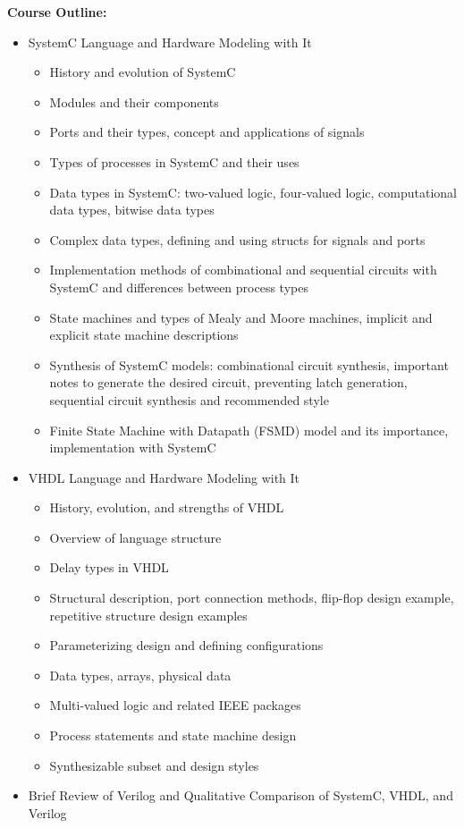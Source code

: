 \documentclass[12pt]{article}
\begin{document}
\textbf{Course Outline:}
\begin{itemize}
    \item SystemC Language and Hardware Modeling with It
    \begin{itemize}
        \item History and evolution of SystemC
        \item Modules and their components
        \item Ports and their types, concept and applications of signals
        \item Types of processes in SystemC and their uses
        \item Data types in SystemC: two-valued logic, four-valued logic, computational data types, bitwise data types
        \item Complex data types, defining and using structs for signals and ports
        \item Implementation methods of combinational and sequential circuits with SystemC and differences between process types
        \item State machines and types of Mealy and Moore machines, implicit and explicit state machine descriptions
        \item Synthesis of SystemC models: combinational circuit synthesis, important notes to generate the desired circuit, preventing latch generation, sequential circuit synthesis and recommended style
        \item Finite State Machine with Datapath (FSMD) model and its importance, implementation with SystemC
    \end{itemize}
    \item VHDL Language and Hardware Modeling with It
    \begin{itemize}
        \item History, evolution, and strengths of VHDL
        \item Overview of language structure
        \item Delay types in VHDL
        \item Structural description, port connection methods, flip-flop design example, repetitive structure design examples
        \item Parameterizing design and defining configurations
        \item Data types, arrays, physical data
        \item Multi-valued logic and related IEEE packages
        \item Process statements and state machine design
        \item Synthesizable subset and design styles
    \end{itemize}
    \item Brief Review of Verilog and Qualitative Comparison of SystemC, VHDL, and Verilog
\end{itemize}
\end{document}
